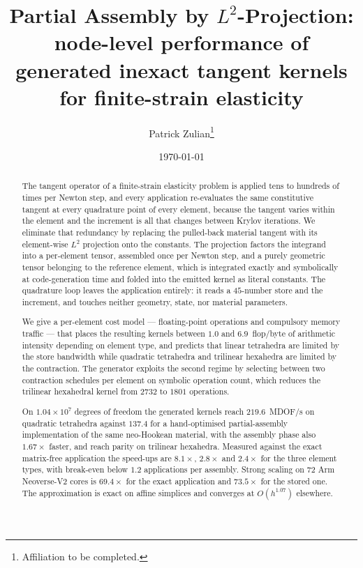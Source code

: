 \documentclass[11pt]{article}
\title{Partial Assembly by $L^2$-Projection:\\
       node-level performance of generated inexact tangent kernels\\
       for finite-strain elasticity}
\author{Patrick Zulian\thanks{Affiliation to be completed.}}
\date{\today}
\begin{document}
\maketitle

\begin{abstract}
The tangent operator of a finite-strain elasticity problem is applied tens to
hundreds of times per Newton step, and every application re-evaluates the same
constitutive tangent at every quadrature point of every element, because the
tangent varies within the element and the increment is all that changes between
Krylov iterations.  We eliminate that redundancy by replacing the pulled-back
material tangent with its element-wise $L^2$ projection onto the constants.  The
projection factors the integrand into a per-element tensor, assembled once per
Newton step, and a purely geometric tensor belonging to the reference element,
which is integrated exactly and symbolically at code-generation time and folded
into the emitted kernel as literal constants.  The quadrature loop leaves the
application entirely: it reads a $45$-number store and the increment, and
touches neither geometry, state, nor material parameters.

We give a per-element cost model --- floating-point operations and compulsory
memory traffic --- that places the resulting kernels between $1.0$ and
$6.9$~flop/byte of arithmetic intensity depending on element type, and predicts
that linear tetrahedra are limited by the store bandwidth while quadratic
tetrahedra and trilinear hexahedra are limited by the contraction.  The
generator exploits the second regime by selecting between two contraction
schedules per element on symbolic operation count, which reduces the trilinear
hexahedral kernel from $2732$ to $1801$ operations.

On $1.04\times10^{7}$ degrees of freedom the generated kernels reach
$219.6$~MDOF/s on quadratic tetrahedra against $137.4$ for a hand-optimised
partial-assembly implementation of the same neo-Hookean material, with the
assembly phase also $1.67\times$ faster, and reach parity on trilinear
hexahedra.  Measured against the exact matrix-free application the speed-ups are
$8.1\times$, $2.8\times$ and $2.4\times$ for the three element types, with
break-even below $1.2$ applications per assembly.  Strong scaling on $72$ Arm
Neoverse-V2 cores is $69.4\times$ for the exact application and $73.5\times$ for
the stored one.  The approximation is exact on affine simplices and converges at
$O(h^{1.07})$ elsewhere.
\end{abstract}
\end{document}
